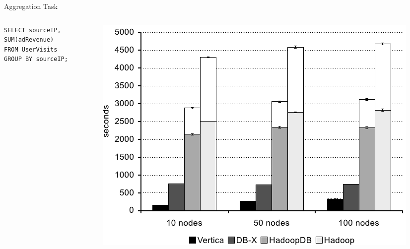 \documentclass{beamer}
\begin{document}
\begin{frame}[fragile]{Aggregation Task}
  \begin{columns}
    \begin{column}{0.3\textwidth}
\begin{verbatim}
SELECT sourceIP,
SUM(adRevenue)
FROM UserVisits 
GROUP BY sourceIP;
\end{verbatim} 
    \end{column}
    \begin{column}{0.7\textwidth}
      \includegraphics[width=\textwidth]{../ausarbeitung/images/diagram_aggregation_task.png}
    \end{column}
  \end{columns}
\end{frame}
\end{document}

